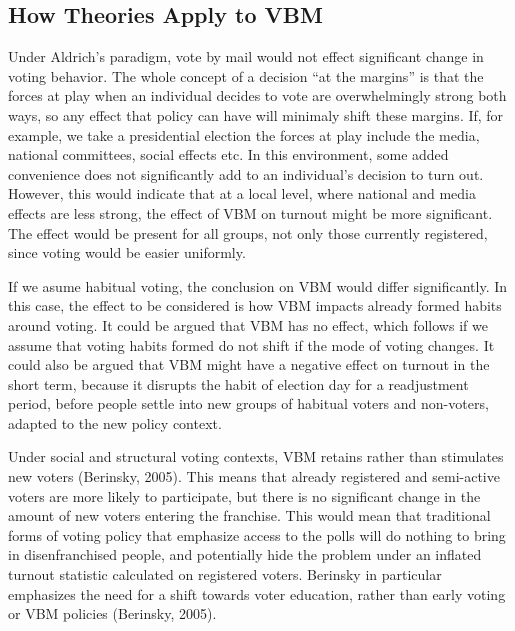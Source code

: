 \documentclass[12pt,twoside]{reedthesis}
\begin{document}
  \subsection{How Theories Apply to VBM}\label{how-theories-apply-to-vbm}
  
  Under Aldrich's paradigm, vote by mail would not effect significant
  change in voting behavior. The whole concept of a decision ``at the
  margins'' is that the forces at play when an individual decides to vote
  are overwhelmingly strong both ways, so any effect that policy can have
  will minimaly shift these margins. If, for example, we take a
  presidential election the forces at play include the media, national
  committees, social effects etc. In this environment, some added
  convenience does not significantly add to an individual's decision to
  turn out. However, this would indicate that at a local level, where
  national and media effects are less strong, the effect of VBM on turnout
  might be more significant. The effect would be present for all groups,
  not only those currently registered, since voting would be easier
  uniformly.
  
  If we asume habitual voting, the conclusion on VBM would differ
  significantly. In this case, the effect to be considered is how VBM
  impacts already formed habits around voting. It could be argued that VBM
  has no effect, which follows if we assume that voting habits formed do
  not shift if the mode of voting changes. It could also be argued that
  VBM might have a negative effect on turnout in the short term, because
  it disrupts the habit of election day for a readjustment period, before
  people settle into new groups of habitual voters and non-voters, adapted
  to the new policy context.
  
  Under social and structural voting contexts, VBM retains rather than
  stimulates new voters (Berinsky, 2005). This means that already
  registered and semi-active voters are more likely to participate, but
  there is no significant change in the amount of new voters entering the
  franchise. This would mean that traditional forms of voting policy that
  emphasize access to the polls will do nothing to bring in
  disenfranchised people, and potentially hide the problem under an
  inflated turnout statistic calculated on registered voters. Berinsky in
  particular emphasizes the need for a shift towards voter education,
  rather than early voting or VBM policies (Berinsky, 2005).
  
\end{document}
